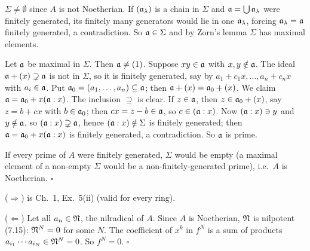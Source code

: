\documentclass[11pt]{article}
\begin{document}
\pf
$\Sigma\ne\emptyset$ since $A$ is not Noetherian. If $(\mathfrak a_\lambda)$ is a chain in $\Sigma$ and $\mathfrak a=\bigcup\mathfrak a_\lambda$ were finitely generated, its finitely many generators would lie in one $\mathfrak a_\lambda$, forcing $\mathfrak a_\lambda=\mathfrak a$ finitely generated, a contradiction. So $\mathfrak a\in\Sigma$ and by Zorn's lemma $\Sigma$ has maximal elements.

Let $\mathfrak a$ be maximal in $\Sigma$. Then $\mathfrak a\ne(1)$. Suppose $xy\in\mathfrak a$ with $x,y\notin\mathfrak a$. The ideal $\mathfrak a+(x)\supsetneq\mathfrak a$ is not in $\Sigma$, so it is finitely generated, say by $a_1+c_1x,\dots,a_n+c_nx$ with $a_i\in\mathfrak a$. Put $\mathfrak a_0=(a_1,\dots,a_n)\subseteq\mathfrak a$; then $\mathfrak a+(x)=\mathfrak a_0+(x)$. We claim $\mathfrak a=\mathfrak a_0+x(\mathfrak a:x)$. The inclusion $\supseteq$ is clear. If $z\in\mathfrak a$, then $z\in\mathfrak a_0+(x)$, say $z=b+cx$ with $b\in\mathfrak a_0$; then $cx=z-b\in\mathfrak a$, so $c\in(\mathfrak a:x)$. Now $(\mathfrak a:x)\ni y$ and $y\notin\mathfrak a$, so $(\mathfrak a:x)\supsetneq\mathfrak a$, hence $(\mathfrak a:x)\notin\Sigma$ is finitely generated; then $\mathfrak a=\mathfrak a_0+x(\mathfrak a:x)$ is finitely generated, a contradiction. So $\mathfrak a$ is prime.

If every prime of $A$ were finitely generated, $\Sigma$ would be empty (a maximal element of a non-empty $\Sigma$ would be a non-finitely-generated prime), i.e.\ $A$ is Noetherian. \hfill$\square$

\pf
($\Rightarrow$) is Ch.~1, Ex.~5(ii) (valid for every ring).

($\Leftarrow$) Let all $a_n\in\mathfrak N$, the nilradical of $A$. Since $A$ is Noetherian, $\mathfrak N$ is nilpotent (7.15): $\mathfrak N^N=0$ for some $N$. The coefficient of $x^k$ in $f^N$ is a sum of products $a_{i_1}\cdots a_{i_N}\in\mathfrak N^N=0$. So $f^N=0$. \hfill$\square$
\end{document}
